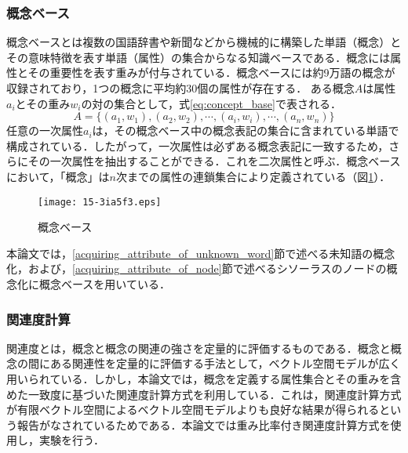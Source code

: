\documentclass[japanese]{jnlp_1.4}
\begin{document}
\subsubsection{概念ベース}\label{concept_base}

概念ベースとは複数の国語辞書や新聞などから機械的に構築した単語（概念）とその意味特徴を表す単語（属性）の集合からなる知識ベースである．概念には属性とその重要性を表す重みが付与されている．概念ベースには約9万語の概念が収録されており，1つの概念に平均約30個の属性が存在する．
ある概念$A$は属性$a_i$とその重み$w_i$の対の集合として，式\ref{eq:concept_base}で表される．
\begin{equation}
A=\{(a_1,w_1),(a_2,w_2),\cdots,(a_i,w_i),\cdots,(a_n,w_n)\}
 \label{eq:concept_base}
\end{equation}
任意の一次属性$a_i$は，その概念ベース中の概念表記の集合に含まれている単語で構成されている．したがって，一次属性は必ずある概念表記に一致するため，さらにその一次属性を抽出することができる．これを二次属性と呼ぶ．概念ベースにおいて，「概念」は$n$次までの属性の連鎖集合により定義されている（図\ref{fig:concept_base}）．

\begin{figure}[t]
\begin{center}
\texttt{[image: 15-3ia5f3.eps]}
\end{center}
\caption{概念ベース}
\label{fig:concept_base}
\end{figure}

本論文では，\ref{acquiring_attribute_of_unknown_word}節で述べる未知語の概念化，および，\ref{acquiring_attribute_of_node}節で述べるシソーラスのノードの概念化に概念ベースを用いている．


\subsubsection{関連度計算}\label{degree_of_association}

関連度とは，概念と概念の関連の強さを定量的に評価するものである．概念と概念の間にある関連性を定量的に評価する手法として，ベクトル空間モデルが広く用いられている．しかし，本論文では，概念を定義する属性集合とその重みを含めた一致度に基づいた関連度計算方式を利用している．これは，関連度計算方式が有限ベクトル空間によるベクトル空間モデルよりも良好な結果が得られるという報告がなされているためである\cite{watabe:01}．本論文では重み比率付き関連度計算方式を使用し，実験を行う\cite{watabe:06}．
\end{document}
